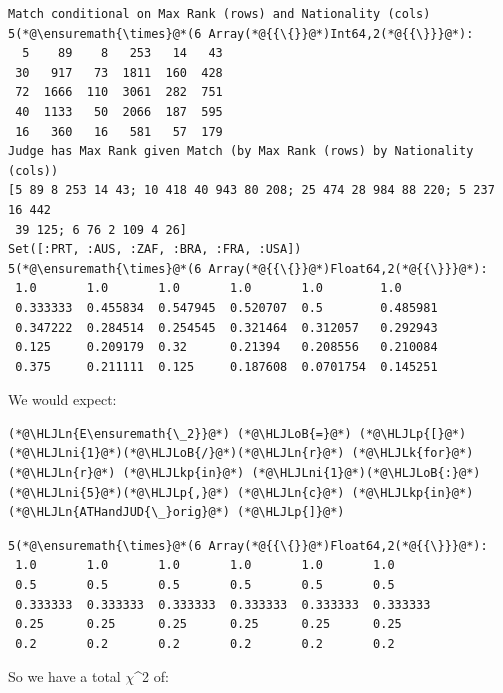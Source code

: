 \documentclass[12pt,a4paper]{article}
\newcommand{\HLJLk}[1]{\textcolor[RGB]{148,91,176}{\textbf{#1}}}
\newcommand{\HLJLkp}[1]{\textcolor[RGB]{148,91,176}{\textbf{#1}}}
\newcommand{\HLJLn}[1]{#1}
\newcommand{\HLJLni}[1]{\textcolor[RGB]{59,151,46}{#1}}
\newcommand{\HLJLoB}[1]{\textcolor[RGB]{102,102,102}{\textbf{#1}}}
\newcommand{\HLJLp}[1]{#1}
\begin{document}
\begin{lstlisting}
Match conditional on Max Rank (rows) and Nationality (cols)
5(*@\ensuremath{\times}@*(6 Array(*@{{\{}}@*)Int64,2(*@{{\}}}@*):
  5    89    8   253   14   43
 30   917   73  1811  160  428
 72  1666  110  3061  282  751
 40  1133   50  2066  187  595
 16   360   16   581   57  179
Judge has Max Rank given Match (by Max Rank (rows) by Nationality (cols))
[5 89 8 253 14 43; 10 418 40 943 80 208; 25 474 28 984 88 220; 5 237 16 442
 39 125; 6 76 2 109 4 26]
Set([:PRT, :AUS, :ZAF, :BRA, :FRA, :USA])
5(*@\ensuremath{\times}@*(6 Array(*@{{\{}}@*)Float64,2(*@{{\}}}@*):
 1.0       1.0       1.0       1.0       1.0        1.0
 0.333333  0.455834  0.547945  0.520707  0.5        0.485981
 0.347222  0.284514  0.254545  0.321464  0.312057   0.292943
 0.125     0.209179  0.32      0.21394   0.208556   0.210084
 0.375     0.211111  0.125     0.187608  0.0701754  0.145251
\end{lstlisting}


We would expect:


\begin{lstlisting}
(*@\HLJLn{E\ensuremath{\_2}}@*) (*@\HLJLoB{=}@*) (*@\HLJLp{[}@*) (*@\HLJLni{1}@*)(*@\HLJLoB{/}@*)(*@\HLJLn{r}@*) (*@\HLJLk{for}@*) (*@\HLJLn{r}@*) (*@\HLJLkp{in}@*) (*@\HLJLni{1}@*)(*@\HLJLoB{:}@*)(*@\HLJLni{5}@*)(*@\HLJLp{,}@*) (*@\HLJLn{c}@*) (*@\HLJLkp{in}@*) (*@\HLJLn{ATHandJUD{\_}orig}@*) (*@\HLJLp{]}@*)
\end{lstlisting}

\begin{lstlisting}
5(*@\ensuremath{\times}@*(6 Array(*@{{\{}}@*)Float64,2(*@{{\}}}@*):
 1.0       1.0       1.0       1.0       1.0       1.0
 0.5       0.5       0.5       0.5       0.5       0.5
 0.333333  0.333333  0.333333  0.333333  0.333333  0.333333
 0.25      0.25      0.25      0.25      0.25      0.25
 0.2       0.2       0.2       0.2       0.2       0.2
\end{lstlisting}


So we have a total \ensuremath{\chi}\^{}2 of:
\end{document}
